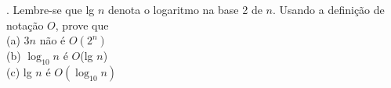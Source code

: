 . Lembre-se que lg $n$ denota o logaritmo na base 2 de $n$. Usando a definição de notação $O$, prove que\\[6pt]
(a) $3n$ não é $O(2^n)$\\
(b) $\log_{10}n$ é $O$(lg $n$)\\
(c) lg $n$ é $O(\log_{10}n)$\\